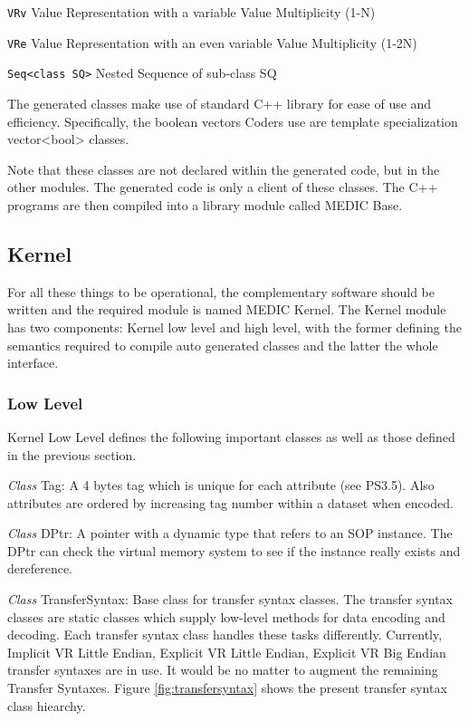 \documentclass[a4paper,10pt]{article}
\begin{document}
\verb+VRv+ Value Representation with a variable Value Multiplicity (1-N)

\verb+VRe+ Value Representation with an even variable Value Multiplicity (1-2N)

\verb+Seq<class SQ>+ Nested Sequence of sub-class SQ

The generated classes make use of standard C++ library for ease of use and
efficiency. Specifically, the boolean vectors Coders use are template
specialization vector<bool> classes.

Note that these classes are not declared within the generated code, but in
the other modules. The generated code is only a client of these classes. The
C++ programs are then compiled into a library module called MEDIC Base.

\subsection{Kernel}

For all these things to be operational, the complementary software should be
written and the required module is named MEDIC Kernel. The Kernel module
has two components:
Kernel low level and high level, with
the former defining the semantics required to compile auto generated classes
and the latter the whole interface.


\newenvironment{class}[1]
{\textit{Class} #1:}
{
  
}

\subsubsection{Low Level}

Kernel Low Level defines the following important classes as
well as those defined in the previous section.

\begin{class}{Tag}
  A 4 bytes tag which is unique for each attribute (see PS3.5). Also
  attributes are ordered by increasing tag number within a dataset when
  encoded.
\end{class}

\begin{class}{DPtr}
A pointer with a dynamic type that refers to an SOP instance. The DPtr
can check the virtual memory system to see if the instance really exists and
dereference.
\end{class}

\begin{class}{TransferSyntax}
  Base class for transfer syntax classes. The transfer syntax
  classes are static classes which supply low-level methods for data encoding
  and decoding. Each transfer syntax class handles these tasks differently.
  Currently, Implicit VR Little Endian, Explicit VR Little Endian, Explicit VR
  Big Endian transfer syntaxes are in use. It would be no matter to augment
  the remaining Transfer Syntaxes. Figure \ref{fig:transfersyntax}
  shows the present transfer syntax class hiearchy.
\end{class}
\end{document}
